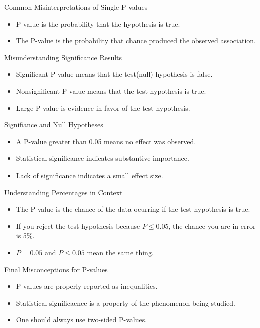 \documentclass[aspectratio=169, 12pt]{beamer}
\begin{document}
\begin{frame}{Common Misinterpretations of Single P-values} %
\begin{itemize}
    \item P-value is the probability that the hypothesis is true.
    \item The P-value is the probability that chance produced the observed association.
\end{itemize}
\end{frame}

\begin{frame}{Misunderstanding Significance Results} %
\begin{itemize}
    \item Significant P-value means that the test(null) hypothesis is false.
    \item Nonsignificant P-value means that the test hypothesis is true.
    \item Large P-value is evidence in favor of the test hypothesis.
\end{itemize}
\end{frame}

\begin{frame}{Signifiance and Null Hypotheses} %
\begin{itemize}
    \item A P-value greater than 0.05 means no effect was observed.
    \item Statistical significance indicates substantive importance.
    \item Lack of significance indicates a small effect size. 
\end{itemize}
\end{frame}

\begin{frame}{Understanding Percentages in Context} %
\begin{itemize}
    \item The P-value is the chance of the data ocurring if the test hypothesis is true.
    \item If you reject the test hypothesis because \( P \leq 0.05 \), the chance you are in error is 5\%.
    \item \( P = 0.05 \) and \( P \leq 0.05 \) mean the same thing.
\end{itemize}
\end{frame}

\begin{frame}{Final Misconceptions for P-values} %
\begin{itemize}
    \item P-values are properly reported as inequalities.
    \item Statistical significacnce is a property of the phenomenon being studied.
    \item One should always use two-sided P-values.
\end{itemize}
\end{frame}
\end{document}

